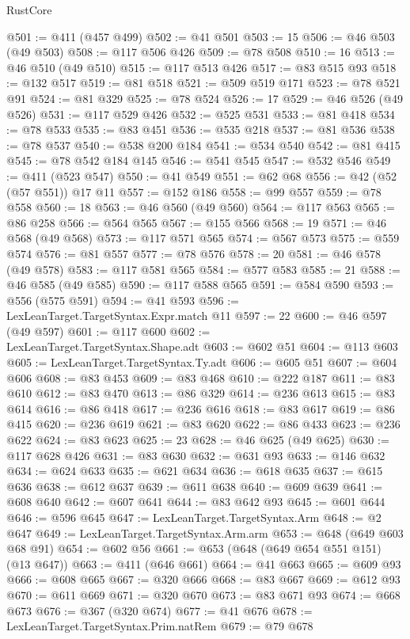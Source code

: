 \begin{lexlean}{RustCore}
\begin{coremodule}
@501 := @411 (@457 @499)
@502 := @41 @501
@503 := 15
@506 := @46 @503 (@49 @503)
@508 := @117 @506 @426
@509 := @78 @508
@510 := 16
@513 := @46 @510 (@49 @510)
@515 := @117 @513 @426
@517 := @83 @515 @93
@518 := @132 @517
@519 := @81 @518
@521 := @509 @519 @171
@523 := @78 @521 @91
@524 := @81 @329
@525 := @78 @524
@526 := 17
@529 := @46 @526 (@49 @526)
@531 := @117 @529 @426
@532 := @525 @531
@533 := @81 @418
@534 := @78 @533
@535 := @83 @451
@536 := @535 @218
@537 := @81 @536
@538 := @78 @537
@540 := @538 @200 @184
@541 := @534 @540
@542 := @81 @415
@545 := @78 @542 @184 @145
@546 := @541 @545
@547 := @532 @546
@549 := @411 (@523 @547)
@550 := @41 @549
@551 := @62 @68
@556 := @42 (@52 (@57 @551)) @17 @11
@557 := @152 @186
@558 := @99 @557
@559 := @78 @558
@560 := 18
@563 := @46 @560 (@49 @560)
@564 := @117 @563
@565 := @86 @258
@566 := @564 @565
@567 := @155 @566
@568 := 19
@571 := @46 @568 (@49 @568)
@573 := @117 @571 @565
@574 := @567 @573
@575 := @559 @574
@576 := @81 @557
@577 := @78 @576
@578 := 20
@581 := @46 @578 (@49 @578)
@583 := @117 @581 @565
@584 := @577 @583
@585 := 21
@588 := @46 @585 (@49 @585)
@590 := @117 @588 @565
@591 := @584 @590
@593 := @556 (@575 @591)
@594 := @41 @593
@596 := LexLeanTarget.TargetSyntax.Expr.match @11
@597 := 22
@600 := @46 @597 (@49 @597)
@601 := @117 @600
@602 := LexLeanTarget.TargetSyntax.Shape.adt
@603 := @602 @51
@604 := @113 @603
@605 := LexLeanTarget.TargetSyntax.Ty.adt
@606 := @605 @51
@607 := @604 @606
@608 := @83 @453
@609 := @83 @468
@610 := @222 @187
@611 := @83 @610
@612 := @83 @470
@613 := @86 @329
@614 := @236 @613
@615 := @83 @614
@616 := @86 @418
@617 := @236 @616
@618 := @83 @617
@619 := @86 @415
@620 := @236 @619
@621 := @83 @620
@622 := @86 @433
@623 := @236 @622
@624 := @83 @623
@625 := 23
@628 := @46 @625 (@49 @625)
@630 := @117 @628 @426
@631 := @83 @630
@632 := @631 @93
@633 := @146 @632
@634 := @624 @633
@635 := @621 @634
@636 := @618 @635
@637 := @615 @636
@638 := @612 @637
@639 := @611 @638
@640 := @609 @639
@641 := @608 @640
@642 := @607 @641
@644 := @83 @642 @93
@645 := @601 @644
@646 := @596 @645
@647 := LexLeanTarget.TargetSyntax.Arm
@648 := @2 @647
@649 := LexLeanTarget.TargetSyntax.Arm.arm
@653 := @648 (@649 @603 @68 @91)
@654 := @602 @56
@661 := @653 (@648 (@649 @654 @551 @151) (@13 @647))
@663 := @411 (@646 @661)
@664 := @41 @663
@665 := @609 @93
@666 := @608 @665
@667 := @320 @666
@668 := @83 @667
@669 := @612 @93
@670 := @611 @669
@671 := @320 @670
@673 := @83 @671 @93
@674 := @668 @673
@676 := @367 (@320 @674)
@677 := @41 @676
@678 := LexLeanTarget.TargetSyntax.Prim.natRem
@679 := @79 @678

\end{coremodule}
\end{lexlean}
